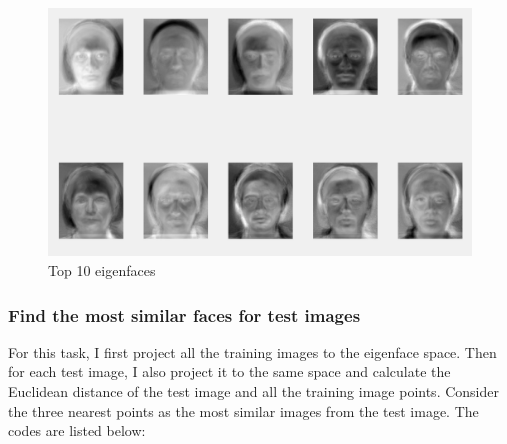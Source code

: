 \documentclass{article}
\begin{document}
\begin{figure}[htbp]
    \centering
    \includegraphics[scale = 0.25]{10.png}
    \caption{Top 10 eigenfaces}
    \label{fig6}
\end{figure}

\subsubsection*{Find the most similar faces for test images}

For this task, I first project all the training images to the eigenface space. Then for each test image, I also project it to the same space and calculate the Euclidean distance of the test image and all the training image points. Consider the three nearest points as the most similar images from the test image. The codes are listed below:
\end{document}
